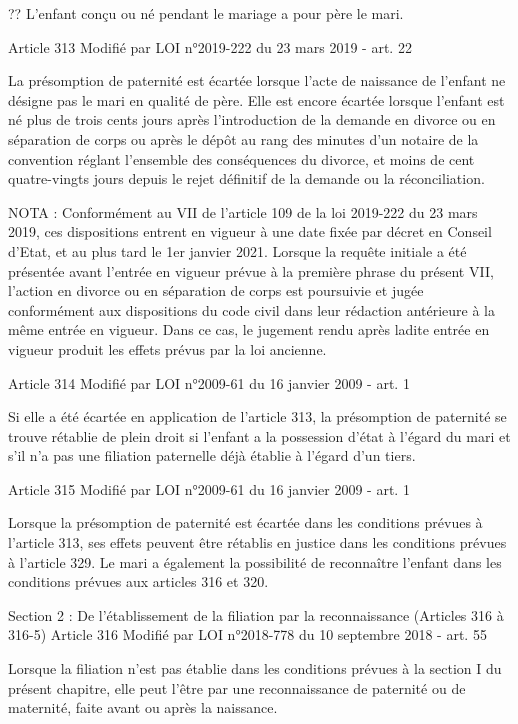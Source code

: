 \documentclass[
  12pt,
]{book}
\begin{document}
\begin{encadre}{??}
L'enfant conçu ou né pendant le mariage a pour père le mari.

Article 313
Modifié par LOI n°2019-222 du 23 mars 2019 - art. 22

La présomption de paternité est écartée lorsque l'acte de naissance de l'enfant ne désigne pas le mari en qualité de père. Elle est encore écartée lorsque l'enfant est né plus de trois cents jours après l'introduction de la demande en divorce ou en séparation de corps ou après le dépôt au rang des minutes d'un notaire de la convention réglant l'ensemble des conséquences du divorce, et moins de cent quatre-vingts jours depuis le rejet définitif de la demande ou la réconciliation.

NOTA :
Conformément au VII de l’article 109 de la loi 2019-222 du 23 mars 2019, ces dispositions entrent en vigueur à une date fixée par décret en Conseil d'Etat, et au plus tard le 1er janvier 2021. Lorsque la requête initiale a été présentée avant l'entrée en vigueur prévue à la première phrase du présent VII, l'action en divorce ou en séparation de corps est poursuivie et jugée conformément aux dispositions du code civil dans leur rédaction antérieure à la même entrée en vigueur. Dans ce cas, le jugement rendu après ladite entrée en vigueur produit les effets prévus par la loi ancienne.

Article 314
Modifié par LOI n°2009-61 du 16 janvier 2009 - art. 1

Si elle a été écartée en application de l'article 313, la présomption de paternité se trouve rétablie de plein droit si l'enfant a la possession d'état à l'égard du mari et s'il n'a pas une filiation paternelle déjà établie à l'égard d'un tiers.

Article 315
Modifié par LOI n°2009-61 du 16 janvier 2009 - art. 1

Lorsque la présomption de paternité est écartée dans les conditions prévues à l'article 313, ses effets peuvent être rétablis en justice dans les conditions prévues à l'article 329. Le mari a également la possibilité de reconnaître l'enfant dans les conditions prévues aux articles 316 et 320.

Section 2 : De l'établissement de la filiation par la reconnaissance (Articles 316 à 316-5)
Article 316
Modifié par LOI n°2018-778 du 10 septembre 2018 - art. 55

Lorsque la filiation n'est pas établie dans les conditions prévues à la section I du présent chapitre, elle peut l'être par une reconnaissance de paternité ou de maternité, faite avant ou après la naissance.


\end{encadre}
\end{document}
